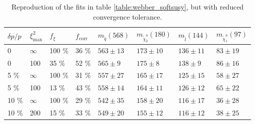 \documentclass[twoside,english]{uiofysmaster}
\begin{document}
\begin{table}[hbt]
	\centering
	\begin{tabular}{| l | l | l | l  || l | l | l | l |}
		\hline
		$\delta p/p$ & $\xi^2_\mathrm{max}$ & $f_\xi$ & $f_\mathrm{corr}$ & $m_{\tilde q} (568)$ & $m_{\tilde \chi_2^0} (180)$ & $m_{\tilde l} (144)$ & $m_{\tilde \chi_1^0} (97)$ \\
		\hline \hline
		0 & 	$\infty$ &	100 \%	& 36 \%	& $563 \pm 13$	&	$173 \pm 10$	&	$136 \pm 11$	& 	$83 \pm 19$	\\
		0 &		100 &		35 \%	& 52 \% & $565 \pm 9$	&	$175 \pm 8$		&	$138 \pm 9$	&	$86 \pm 16$	\\
		5 \% &	$\infty$ &	100 \%	& 31 \% & $557 \pm 27$	& 	$165 \pm 17$	&	$125 \pm 15$&	$58 \pm 27$ \\
		5 \% &	100 &		13 \%	& 43 \% & $558 \pm 14$	&	$164 \pm 11$	& 	$126 \pm 12$	&	$65 \pm 22$	\\
		10 \% &	$\infty$ &	100 \%	& 29 \% & $542 \pm 35$	&	$158 \pm 20$	&	$116 \pm 17$&	$36 \pm 28$	\\
		10 \% &	200 &		15 \%	& 33 \% & $549 \pm 20$	& 	$155 \pm 12$	&	$116 \pm 12$&	$38 \pm 25$ \\
		\hline
	\end{tabular}
	\caption{Reproduction of the fits in table \ref{table:webber_softsusy}, but with reduced convergence tolerance.}
	\label{table:webber_rec_lowtol}
\end{table}
\end{document}
